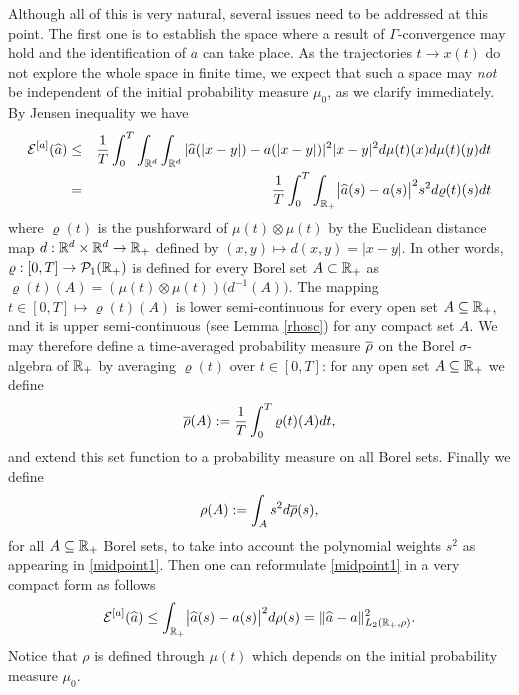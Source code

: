 Although all of this is very natural, several issues  need to be addressed at this point.
The first one is to establish the space where a result of $\Gamma$-convergence may hold and the identification of $a$ can take place.
As the trajectories $t\to x(t)$ do not explore the whole  space in finite time, we expect that such a space may {\it not} be independent of the initial probability measure $\mu_0$, as we clarify immediately.
By Jensen inequality we have
\begin{eqnarray}
\mathcal E^{[a]}(\widehat a)  &\leq & \frac{1}{T}\int_0^T  \int_{\mathbb{R}^d} \int_{\mathbb{R}^d}  | \widehat a(| x-y|) - a(| x-y|)|^2 | x-y|^2d \mu(t)(x) d \mu(t)(y) dt  \label{est-functional-1}\\
&= & \frac{1}{T}  \int_0^T\int_{\mathbb{R}_+}\bigl|\widehat a(s)-a(s)\bigr|^2 s^2d\varrho(t)(s) dt \label{midpoint1}
\end{eqnarray}
where $\varrho(t)$ is the pushforward of $\mu(t)\otimes\mu(t)$ by the Euclidean distance map
	$d:\mathbb{R}^d\times\mathbb{R}^d\rightarrow\mathbb{R}_+$ %
 	defined by $(x,y)\mapsto d(x,y)=|x-y|$. %
In other words, $\varrho:[0,T]\rightarrow \mathcal{P}_1(\mathbb{R}_+)$ is defined for every Borel set $A\subset\mathbb{R}_+$ as $\varrho(t)(A)=(\mu(t)\otimes\mu(t))\bigl(d^{-1}(A)\bigr)$.
The mapping $t \in [0,T] \mapsto\varrho(t)(A)$ is lower semi-continuous for every open set $A\subseteq\mathbb{R}_+$, and it is upper semi-continuous (see Lemma \ref{rhosc}) for any compact set $A$.
We may therefore define a time-averaged probability measure $\overline\rho$ on the Borel $\sigma$-algebra of $\mathbb{R}_+$ by averaging $\varrho(t)$ over $t \in [0,T]$: for any open set $A \subseteq \mathbb{R}_+$ we define
\begin{align}\label{finallyrho}%
	\prerho(A):=\frac{1}{T}\int_0^T\varrho(t)(A)dt,
\end{align}
and extend this set function to a probability measure on all Borel sets. Finally we define
\begin{equation}
 \rho(A):=\int_A s^2 d\overline\rho(s),
 \label{rho}
\end{equation}
for all  $A\subseteq\mathbb{R}_+$ Borel sets, to take into account the polynomial weights $s^2$ as appearing in \eqref{midpoint1}.
Then one can reformulate \eqref{midpoint1} in a very compact form as follows
\begin{align}\label{midpoint2}
	\mathcal E^{[a]}(\widehat a)\leq \int_{\mathbb{R}_+}\bigl|\widehat a(s)-a(s)\bigr|^2 d \rho(s)
		=\| \widehat a - a \|^2_{L_2(\mathbb R_+,\rho)}.
\end{align}
Notice that $\rho$ is defined through $\mu(t)$ which depends on the initial probability measure $\mu_0$. 

